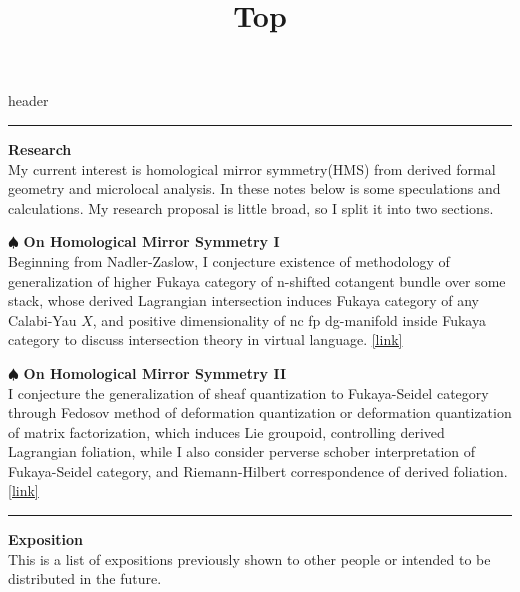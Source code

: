 \documentclass{article}
\title{Top}
\begin{document}
 {header}


\noindent\rule{\textwidth}{0.4pt}


\begin{minipage}{0.85\textwidth}
\noindent
\textbf{Research} \\

\noindent
My current interest is homological mirror symmetry(HMS) from derived formal geometry and microlocal analysis.
In these notes below is some speculations and calculations. My research proposal is little broad, so I split it into two sections. 
\end{minipage}


\noindent
\begin{minipage}{\textwidth}
\noindent $\spadesuit$ \textbf{On Homological Mirror Symmetry I} \\
Beginning from Nadler-Zaslow, I conjecture existence of methodology of generalization of higher Fukaya category of 
n-shifted cotangent bundle over some stack, whose derived Lagrangian intersection induces Fukaya category of any Calabi-Yau $X$,
and positive dimensionality of nc fp dg-manifold inside Fukaya category to discuss intersection theory in virtual language.
\href{https://kojisunami.github.io/src/ainfty-geometry.pdf}{[link]} 
\end{minipage}


\noindent
\begin{minipage}{\textwidth}
\noindent $\spadesuit$ \textbf{On Homological Mirror Symmetry II} \\
I conjecture the generalization of sheaf quantization to Fukaya-Seidel category through Fedosov method of deformation quantization
or deformation quantization of matrix factorization, which induces Lie groupoid, controlling derived Lagrangian foliation,
while I also consider perverse schober interpretation of Fukaya-Seidel category, and Riemann-Hilbert correspondence of derived foliation.
\href{https://kojisunami.github.io/src/dgla-stack.pdf}{[link]}  
\end{minipage}


\noindent\rule{\textwidth}{0.4pt}


\begin{minipage}{0.85\textwidth}
\noindent
\textbf{Exposition} \\

\noindent
This is a list of expositions previously shown to other people or intended to be distributed in the future.
\end{minipage}
\end{document}

